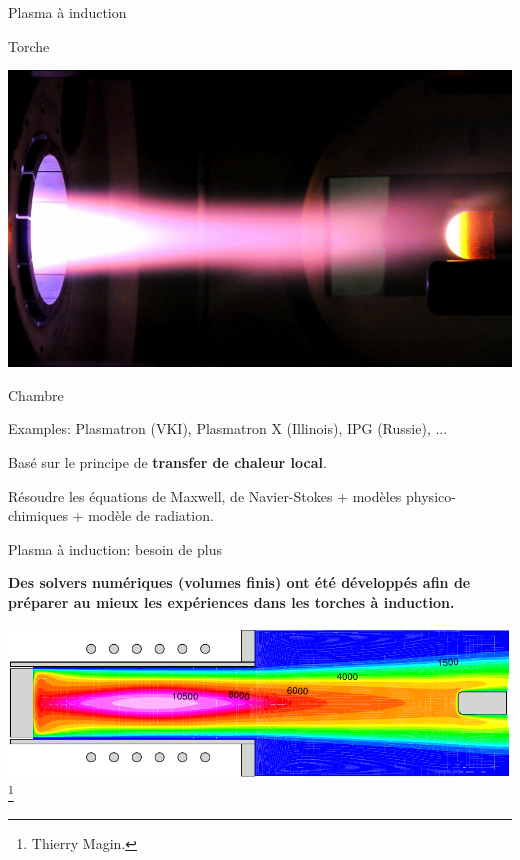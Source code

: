 \documentclass[24pt,t,table, aspectratio=169]{beamer}
\begin{document}
\begin{frame}{Plasma à induction}
\begin{minipage}[t]{0.5\linewidth}
\begin{tikzpicture}[scale=0.7]
    \end{tikzpicture}
    
    \vspace{0.45cm}
    Torche
    \end{minipage}
    \begin{minipage}[t]{0.49\linewidth}
    \centering
    \vspace{0.5cm}\includegraphics[width=\linewidth]{Ablation-testing-at-the-Plasmatron-ICP-facility-of-the-VKI-3.jpg}
    
    Chambre
    \end{minipage}
    
    {
    Examples: Plasmatron (VKI), Plasmatron X (Illinois), IPG (Russie), ...
    
    Basé sur le principe de \textbf{transfer de chaleur local}.
    }
    {
    	Résoudre les équations de Maxwell, de Navier-Stokes + modèles physico-chimiques + modèle de radiation.
    }
\end{frame}

\begin{frame}{Plasma à induction: besoin de plus}

\begin{center}
\begin{framed}
\textbf{Des solvers numériques (volumes finis) ont été développés afin de préparer au mieux les expériences dans les torches à induction.}
\end{framed}
\includegraphics[width=.7\linewidth]{lhtsT.pdf}\footnote{\tiny Thierry Magin.}
\end{center}
\end{frame}
\end{document}
